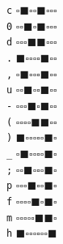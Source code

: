 \documentclass[a4paper]{article}
\begin{document}
\verb|c| $\square\blacksquare\square\square$\hspace{2cm}$\blacksquare\square\square\square$\\
\verb|0| $\square\square\blacksquare\square$\hspace{2cm}$\blacksquare\square\square\square$\\
\verb|d| $\square\square\square\blacksquare$\hspace{2cm}$\blacksquare\square\square\square$\\
\verb|.| $\blacksquare\square\square\square$\hspace{2cm}$\square\blacksquare\square\square$\\
\verb|,| $\square\blacksquare\square\square$\hspace{2cm}$\square\blacksquare\square\square$\\
\verb|u| $\square\square\blacksquare\square$\hspace{2cm}$\square\blacksquare\square\square$\\
\verb|-| $\square\square\square\blacksquare$\hspace{2cm}$\square\blacksquare\square\square$\\
\verb|(| $\square\square\square\square$\hspace{2cm}$\blacksquare\blacksquare\square\square$\\
\verb|)| $\blacksquare\square\square\square$\hspace{2cm}$\square\square\blacksquare\square$\\
\verb|_| $\square\blacksquare\square\square$\hspace{2cm}$\square\square\blacksquare\square$\\
\verb|;| $\square\square\blacksquare\square$\hspace{2cm}$\square\square\blacksquare\square$\\
\verb|p| $\square\square\square\blacksquare$\hspace{2cm}$\square\square\blacksquare\square$\\
\verb|f| $\square\square\square\square$\hspace{2cm}$\blacksquare\square\blacksquare\square$\\
\verb|m| $\square\square\square\square$\hspace{2cm}$\square\blacksquare\blacksquare\square$\\
\verb|h| $\blacksquare\square\square\square$\hspace{2cm}$\square\square\square\blacksquare$\\
\end{document}
